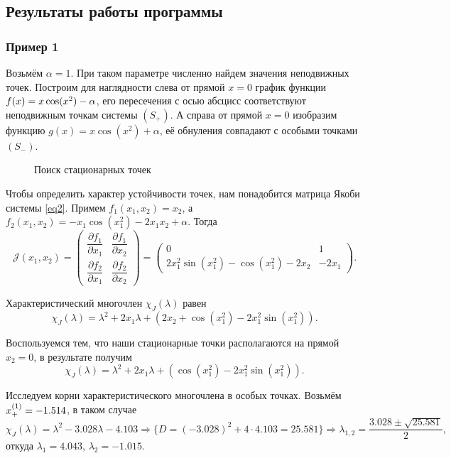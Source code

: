\documentclass[a4paper,12pt]{article}
\newcommand{\hm}[1]{#1\nobreak\discretionary{}{\hbox{\ensuremath{#1}}}{}}
\begin{document}
\subsection{Результаты работы программы}
\subsubsection{Пример 1}
Возьмём $\alpha = 1$. При таком параметре численно найдем значения неподвижных точек. Построим для наглядности слева от прямой $x = 0$ график функции $f(x) \hm = x \cos(x^2) - \alpha$, его пересечения с осью абсцисс соответствуют неподвижным точкам системы $(S_{+})$. А справа от прямой $x = 0$ изобразим функцию $g(x) = x \cos(x^2) + \alpha$, её обнуления совпадают с особыми точками $(S_{-})$.

\begin{figure}[H]
	\centering{\texttt{[image: P1]}}
	\caption{Поиск стационарных точек}
\end{figure}
Чтобы определить характер устойчивости точек, нам понадобится матрица Якоби системы \eqref{eq2}. Примем $f_1(x_1, x_2) = x_2$, а $f_2(x_1, x_2) = -x_1\cos\left(x_1^2\right) - 2x_1x_2 + \alpha$. Тогда 
$$
\mathcal{J}(x_1, x_2) = 
\begin{pmatrix}
	\dfrac{\partial{f}_1}{\partial{x_1}} & \dfrac{\partial{f}_1}{\partial{x_2}} \\[0.75em]
	\dfrac{\partial{f}_2}{\partial{x_1}} & \dfrac{\partial{f}_2}{\partial{x_2}}
\end{pmatrix} =
\begin{pmatrix}
	0 & 1 \\[0.75em]
	2x_1^2\sin(x_1^2) - \cos(x_1^2) -2x_2 & -2x_1
\end{pmatrix}.
$$

Характеристический многочлен $\chi_{J}(\lambda)$ равен
$$\chi_{J}(\lambda) = \lambda^2 + 2x_1\lambda + (2x_2 + \cos(x_1^2) - 2x_1^2\sin(x_1^2)).$$

Воспользуемся тем, что наши стационарные точки располагаются на прямой $x_2 = 0$, в результате получим 
$$\chi_{J}(\lambda) = \lambda^2 + 2x_1\lambda + (\cos(x_1^2) - 2x_1^2\sin(x_1^2)).$$

Исследуем корни характеристического многочлена в особых точках. Возьмём $x_{+}^{(1)} \hm = -1.514$, в таком случае
$$ \chi_{J}(\lambda) = \lambda^2 - 3.028 \lambda - 4.103 \Rightarrow \{ D = (-3.028)^2 + 4 \cdot 4.103 = 25.581 \} \Rightarrow \lambda_{1, 2} = \dfrac{3.028 \pm \sqrt{25.581}}{2}, $$
откуда $\lambda_1 = 4.043$, $\lambda_2 = -1.015$. 
\end{document}
